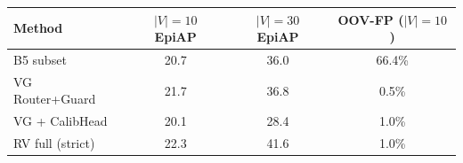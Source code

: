 \begin{tabular}{lccc}
\toprule
Method & $|V|{=}10$ EpiAP & $|V|{=}30$ EpiAP & OOV-FP ($|V|{=}10$) \\
\midrule
B5 subset & 20.7 & 36.0 & 66.4\% \\
VG Router+Guard & 21.7 & 36.8 & 0.5\% \\
VG + CalibHead & 20.1 & 28.4 & 1.0\% \\
RV full (strict) & 22.3 & 41.6 & 1.0\% \\
\bottomrule
\end{tabular}
